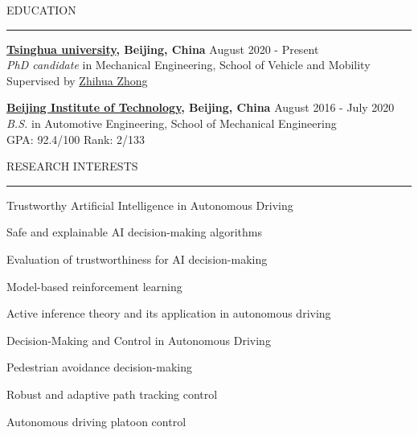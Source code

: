 \documentclass{resume} %
\renewenvironment{rSection}[1]{
\sectionskip
\textcolor{TsinghuaPurple}{\MakeUppercase{#1}}
\sectionlineskip
\hrule
\begin{list}{}{
\setlength{\leftmargin}{0em}
}
\item[]
}{
\end{list}
}
\begin{document}
  


\begin{rSection}{Education}

{\bf \href{https://www.tsinghua.edu.cn/en/}{Tsinghua university}, Beijing, China} \hfill {August 2020 - Present}
\\ 
\textit{PhD candidate} in Mechanical Engineering, School of Vehicle and Mobility
\\
Supervised by \href{https://en.cae.cn/cae/html/en/col2017/column_2017_1.html}{Zhihua Zhong} 

{\bf \href{https://english.bit.edu.cn/}{Beijing Institute of Technology}, Beijing, China} \hfill {August 2016 - July 2020}
\\ 
\textit{B.S.} in Automotive Engineering, School of Mechanical Engineering
\\
GPA: 92.4/100 Rank: 2/133



\end{rSection} 


\begin{rSection}{Research INTERESTS}

\begin{rSubsection}{Trustworthy Artificial Intelligence in Autonomous Driving}{}{}

\item Safe and explainable AI decision-making algorithms
\item Evaluation of trustworthiness for AI decision-making
\item Model-based reinforcement learning 
\item Active inference theory and its application in autonomous driving
\end{rSubsection}  

\begin{rSubsection}{Decision-Making and Control in Autonomous Driving}{}{}

\item Pedestrian avoidance decision-making
\item Robust and adaptive path tracking control  
\item Autonomous driving platoon control
\end{rSubsection}  


\end{rSection}
\end{document}

